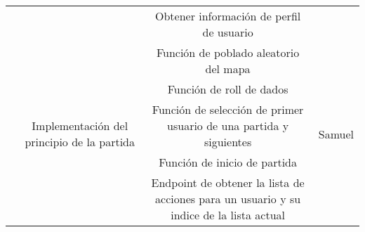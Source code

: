 \documentclass[11pt, a4paper, titlepage]{article}
\begin{document}
\begin{landscape}
\begin{table}[hbt!]
\begin{tabular}{c|cc|c|}
\multicolumn{1}{|c|}{}                             & \multicolumn{1}{c|}{}                                                                                                          & Obtener información de perfil de usuario                                                                                                                                                         &                                     \\ \cline{2-4} 
\multicolumn{1}{|c|}{}                             & \multicolumn{1}{c|}{\multirow{7}{*}{Implementación del principio de la partida}}                                               & Función de poblado aleatorio del mapa                                                                                                                                                            & \multirow{7}{*}{Samuel}             \\ \cline{3-3}
\multicolumn{1}{|c|}{}                             & \multicolumn{1}{c|}{}                                                                                                          & Función de roll de dados                                                                                                                                                                         &                                     \\ \cline{3-3}
\multicolumn{1}{|c|}{}                             & \multicolumn{1}{c|}{}                                                                                                          & Función de selección de primer usuario de una partida y siguientes                                                                                                                               &                                     \\ \cline{3-3}
\multicolumn{1}{|c|}{}                             & \multicolumn{1}{c|}{}                                                                                                          & Función de inicio de partida                                                                                                                                                                     &                                     \\ \cline{3-3}
\multicolumn{1}{|c|}{}                             & \multicolumn{1}{c|}{}                                                                                                          & Endpoint de obtener la lista de acciones para un usuario y su indice de la lista actual                                                                                                          &                                     \\ \cline{3-3}

\end{tabular}
\end{table}
\end{landscape}
\end{document}
